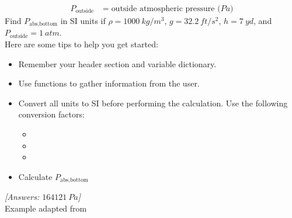 {\begin{minipage}{\linewidth}
\begin{enumerate}
\begin{align*}
P_{\textrm{outside}} &= \textrm{outside atmospheric pressure ($Pa$)}
\end{align*}
Find $P_{\textrm{abs,bottom}}$ in SI units if $\rho=1000~kg/m^3$, $g=32.2~ft/s^2$, $h=7~yd$, and $P_{\textrm{outside}}=1~atm$. \\
Here are some tips to help you get started:
	\begin{itemize}
	\item Remember your header section and variable dictionary.
	\item Use  functions to gather information from the user.
	\item Convert all units to SI before performing the calculation. Use the following conversion factors:
		\renewcommand{\labelitemii}{}
		\begin{itemize}
		\item {}
		\item {}
		\item {}
		\end{itemize}
	\item Calculate $P_{\textrm{abs,bottom}}$
	\end{itemize}
\footnotesize{\textit{[Answers: $164121~Pa$]}\\
Example adapted from \citet{Patzer:2003fk}}	
\normalsize
\end{enumerate}
\end{minipage}%
}\\
\addtolength{\parindent}{4mm}

